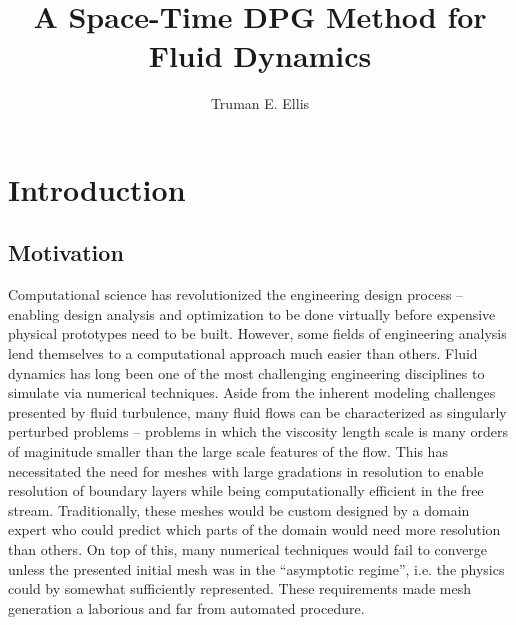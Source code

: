 \documentclass[12pt]{report}
\author{Truman E. Ellis}
\title{A Space-Time DPG Method for Fluid Dynamics}
\begin{document}
\titlepage

\tableofcontents   %



\chapter{Introduction}



\section{Motivation} 

Computational science has revolutionized the engineering design process -- enabling design analysis
and optimization to be done virtually before expensive physical prototypes need to be built.
However, some fields of engineering analysis lend themselves to a computational approach much easier
than others. 
Fluid dynamics has long been one of the most challenging engineering disciplines to simulate via numerical techniques.
Aside from the inherent modeling challenges presented by fluid turbulence, many fluid flows can be characterized as singularly perturbed problems 
-- problems in which the viscosity length scale is many orders of maginitude smaller than the large scale features of the flow.
This has necessitated the need for meshes with large gradations in resolution to enable resolution of boundary layers while being computationally efficient in the free stream.
Traditionally, these meshes would be custom designed by a domain expert who could predict which parts of the domain would need more resolution than others. 
On top of this, many numerical techniques would fail to converge unless the presented initial mesh was in the ``asymptotic regime'', 
i.e. the physics could by somewhat sufficiently represented.
These requirements made mesh generation a laborious and far from automated procedure.
\end{document}
